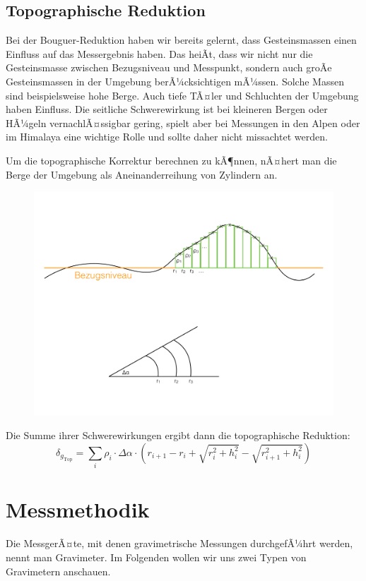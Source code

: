 \subsection{Topographische Reduktion}
Bei der Bouguer-Reduktion haben wir bereits gelernt, dass Gesteinsmassen einen Einfluss auf das Messergebnis haben. Das heiÃt, dass wir nicht nur die Gesteinsmasse zwischen Bezugsniveau und Messpunkt, sondern auch groÃe Gesteinsmassen in der Umgebung berÃ¼cksichtigen mÃ¼ssen. Solche Massen sind beispielsweise hohe Berge. Auch tiefe TÃ¤ler und Schluchten der Umgebung haben Einfluss. Die seitliche Schwerewirkung ist bei kleineren Bergen oder HÃ¼geln vernachlÃ¤ssigbar gering, spielt aber bei Messungen in den Alpen oder im Himalaya eine wichtige Rolle und sollte daher nicht missachtet werden. \par
Um die topographische Korrektur berechnen zu kÃ¶nnen, nÃ¤hert man die Berge der Umgebung als Aneinanderreihung von Zylindern an. 

\begin{figure}[H]
	\centering
	\includegraphics[width = \textwidth]{GravimetrieBilder/TopographischeReduktion}
\end{figure}

Die Summe ihrer Schwerewirkungen ergibt dann die topographische Reduktion: \begin{equation*}
	\delta_{g_{\text{Top}}} = \sum_{i} \rho_{i} \cdot \Delta \alpha \cdot \left( r_{i + 1} - r_i + \sqrt{r_i^2 + h_i^2} - \sqrt{r_{i + 1}^2 + h_i^2}  \right)
\end{equation*}

\section{Messmethodik}
Die MessgerÃ¤te, mit denen gravimetrische Messungen durchgefÃ¼hrt werden, nennt man Gravimeter. Im Folgenden wollen wir uns zwei Typen von Gravimetern anschauen.

